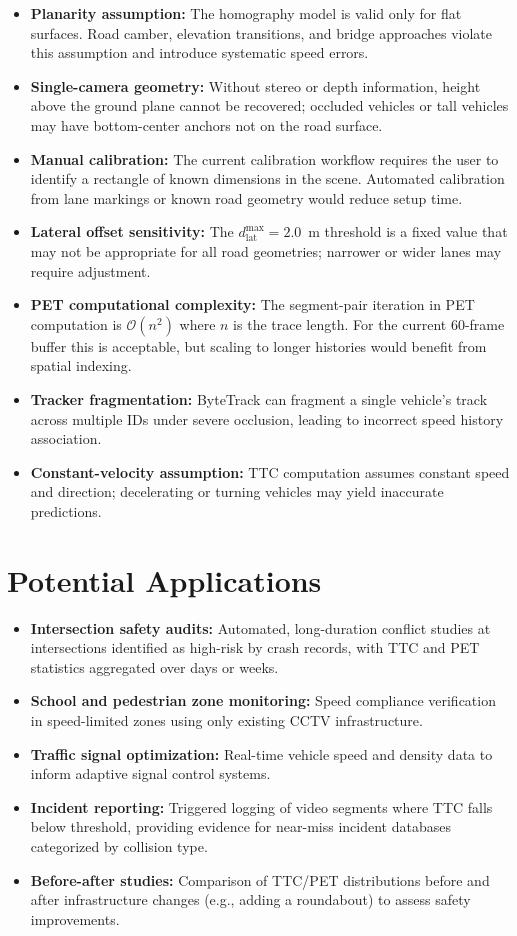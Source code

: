 \documentclass[12pt]{report}
\begin{document}
\begin{itemize}
    \item \textbf{Planarity assumption:} The homography model is valid only for flat surfaces. Road camber, elevation transitions, and bridge approaches violate this assumption and introduce systematic speed errors.
    \item \textbf{Single-camera geometry:} Without stereo or depth information, height above the ground plane cannot be recovered; occluded vehicles or tall vehicles may have bottom-center anchors not on the road surface.
    \item \textbf{Manual calibration:} The current calibration workflow requires the user to identify a rectangle of known dimensions in the scene. Automated calibration from lane markings or known road geometry would reduce setup time.
    \item \textbf{Lateral offset sensitivity:} The $d_\text{lat}^\text{max} = 2.0$~m threshold is a fixed value that may not be appropriate for all road geometries; narrower or wider lanes may require adjustment.
    \item \textbf{PET computational complexity:} The segment-pair iteration in PET computation is $\mathcal{O}(n^2)$ where $n$ is the trace length. For the current 60-frame buffer this is acceptable, but scaling to longer histories would benefit from spatial indexing.
    \item \textbf{Tracker fragmentation:} ByteTrack can fragment a single vehicle's track across multiple IDs under severe occlusion, leading to incorrect speed history association.
    \item \textbf{Constant-velocity assumption:} TTC computation assumes constant speed and direction; decelerating or turning vehicles may yield inaccurate predictions.
\end{itemize}

\section{Potential Applications}

\begin{itemize}
    \item \textbf{Intersection safety audits:} Automated, long-duration conflict studies at intersections identified as high-risk by crash records, with TTC and PET statistics aggregated over days or weeks.
    \item \textbf{School and pedestrian zone monitoring:} Speed compliance verification in speed-limited zones using only existing CCTV infrastructure.
    \item \textbf{Traffic signal optimization:} Real-time vehicle speed and density data to inform adaptive signal control systems.
    \item \textbf{Incident reporting:} Triggered logging of video segments where TTC falls below threshold, providing evidence for near-miss incident databases categorized by collision type.
    \item \textbf{Before-after studies:} Comparison of TTC/PET distributions before and after infrastructure changes (e.g., adding a roundabout) to assess safety improvements.
\end{itemize}
\end{document}
